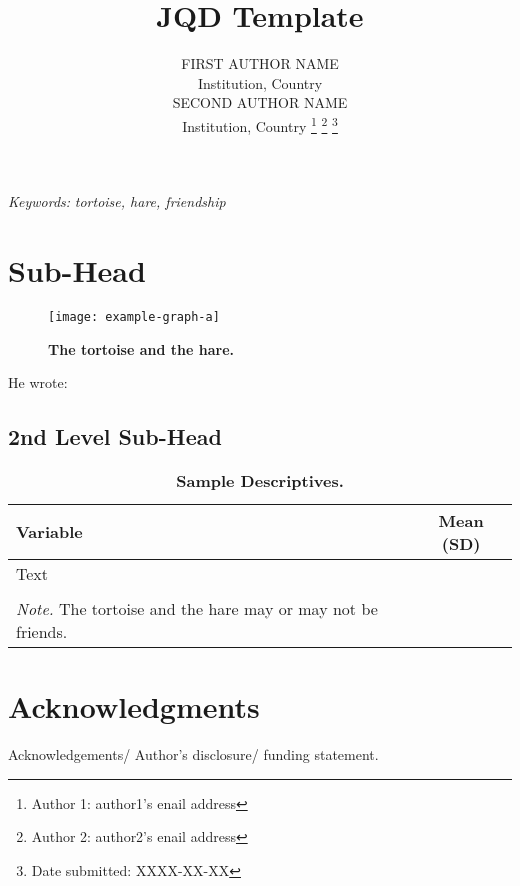 \documentclass[12pt,twoside]{article}
\date{}
\title{\normalsize \headingfont \textbf{JQD Template} \vspace{-1.5em}}
\author{\normalsize FIRST AUTHOR NAME\\ \normalsize Institution, Country 
\vspace{1em} \\ \normalsize SECOND AUTHOR NAME \\ \normalsize Institution, Country \thanks{Author 1: author1's enail address} \thanks{Author 2: author2's enail address} \thanks{Date submitted: XXXX-XX-XX}}
\providecommand{\keywords}[1]
{
   \small	
  \textit{\hspace{-1em} Keywords: } #1
}
\begin{document}
\maketitle
\thispagestyle{firstpage}
\vspace{-8em}
\begin{abstract}
  \noindent  \lipsum[5]
\end{abstract}

\keywords{\textit{tortoise, hare, friendship} \vspace{8ex}}

\lipsum[4-5]
\section{Sub-Head}
\lipsum[6-7]
\begin{figure}[H]
\texttt{[image: example-graph-a]}
\caption{\textbf{The tortoise and the hare.}}
\end{figure}
\lipsum[2] He wrote:

\begin{quotation}
  \lipsum[10] \citep{bergen2000exploring} 
 \end{quotation}
 
\subsection{2nd Level Sub-Head}
\lipsum[7]

\begin{table}[H]
\caption{\textbf{Sample Descriptives.}}
\begin{tabularx}{\textwidth}{ X c }
\toprule
 Variable & Mean (SD)  \\ 
 \midrule
 Text   &  \\
        &   \\
 \bottomrule
 \multicolumn{1}{l}{\textit{Note.} The tortoise and the hare may or may not be friends.}
\end{tabularx}
\end{table}

\lipsum[8]

\section{Acknowledgments}
Acknowledgements/ Author's disclosure/ funding statement.


\end{document}
